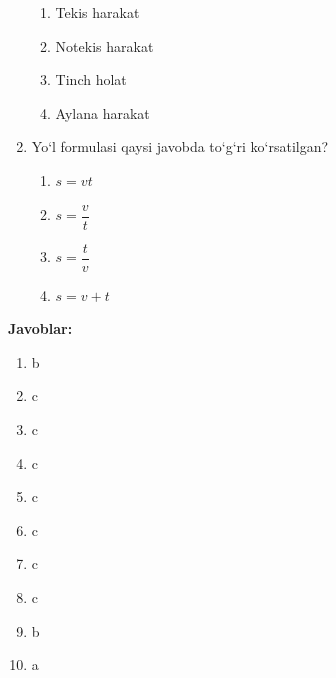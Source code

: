 \begin{enumerate}[label=\textbf{\arabic*.}]
\begin{enumerate}[label=\Alph*)]
    \item Tekis harakat
    \item Notekis harakat
    \item Tinch holat
    \item Aylana harakat
\end{enumerate}



\item Yo‘l formulasi qaysi javobda to‘g‘ri ko‘rsatilgan?

\begin{enumerate}[label=\Alph*)]
    \item $s = vt$
    \item $s = \dfrac{v}{t}$
    \item $s = \dfrac{t}{v}$
    \item $s = v + t$
\end{enumerate}

\end{enumerate}



\textbf{Javoblar:}

\begin{enumerate}
    \item b
    \item c
    \item c
    \item c
    \item c
    \item c
    \item c
    \item c
    \item b
    \item a
\end{enumerate}

